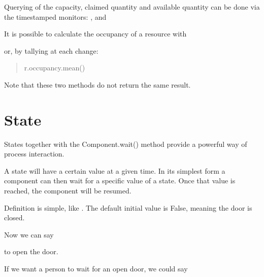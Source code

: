 \documentclass[letterpaper,10pt,english]{sphinxmanual}
\begin{document}
Querying of the capacity, claimed quantity and available quantity can be done via the timestamped monitors:
,  and 

It is possible to calculate the occupancy of a resource with

\begin{sphinxVerbatim}[commandchars=\\\{\}]
    
\end{sphinxVerbatim}

or, by tallying at each change:
\begin{quote}

r.occupancy.mean()
\end{quote}

Note that these two methods do not return the same result.


\chapter{State}
\label{\detokenize{State::doc}}\label{\detokenize{State:state}}
States together with the Component.wait() method provide a powerful way of process interaction.

A state will have a certain value at a given time. In its simplest form a component can then wait for
a specific value of a state. Once that value is reached, the component will be resumed.

Definition is simple, like . The default initial value is False, meaning
the door is closed.

Now we can say

\begin{sphinxVerbatim}[commandchars=\\\{\}]
\end{sphinxVerbatim}

to open the door.

If we want a person to wait for an open door, we could say

\begin{sphinxVerbatim}[commandchars=\\\{\}]
 
\end{sphinxVerbatim}
\end{document}
